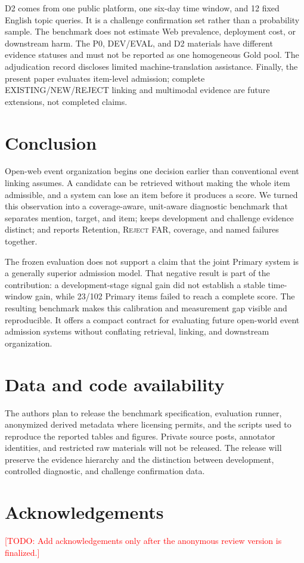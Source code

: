 \documentclass[5p,times]{elsarticle}
\newcommand{\reject}{\mbox{\textsc{Reject}}}
\newcommand{\todo}[1]{\textcolor{red}{[TODO: #1]}}
\begin{document}
D2 comes from one public platform, one six-day time window, and 12 fixed English topic queries. It is a challenge confirmation set rather than a probability sample. The benchmark does not estimate Web prevalence, deployment cost, or downstream harm. The P0, DEV/EVAL, and D2 materials have different evidence statuses and must not be reported as one homogeneous Gold pool. The adjudication record discloses limited machine-translation assistance. Finally, the present paper evaluates item-level admission; complete EXISTING/NEW/REJECT linking and multimodal evidence are future extensions, not completed claims.

\balance
\section{Conclusion}
\label{sec:conclusion}

Open-web event organization begins one decision earlier than conventional event linking assumes. A candidate can be retrieved without making the whole item admissible, and a system can lose an item before it produces a score. We turned this observation into a coverage-aware, unit-aware diagnostic benchmark that separates mention, target, and item; keeps development and challenge evidence distinct; and reports Retention, \reject{} FAR, coverage, and named failures together.

The frozen evaluation does not support a claim that the joint Primary system is a generally superior admission model. That negative result is part of the contribution: a development-stage signal gain did not establish a stable time-window gain, while 23/102 Primary items failed to reach a complete score. The resulting benchmark makes this calibration and measurement gap visible and reproducible. It offers a compact contract for evaluating future open-world event admission systems without conflating retrieval, linking, and downstream organization.

\section*{Data and code availability}

The authors plan to release the benchmark specification, evaluation runner, anonymized derived metadata where licensing permits, and the scripts used to reproduce the reported tables and figures. Private source posts, annotator identities, and restricted raw materials will not be released. The release will preserve the evidence hierarchy and the distinction between development, controlled diagnostic, and challenge confirmation data.

\section*{Acknowledgements}
\todo{Add acknowledgements only after the anonymous review version is finalized.}



\end{document}
